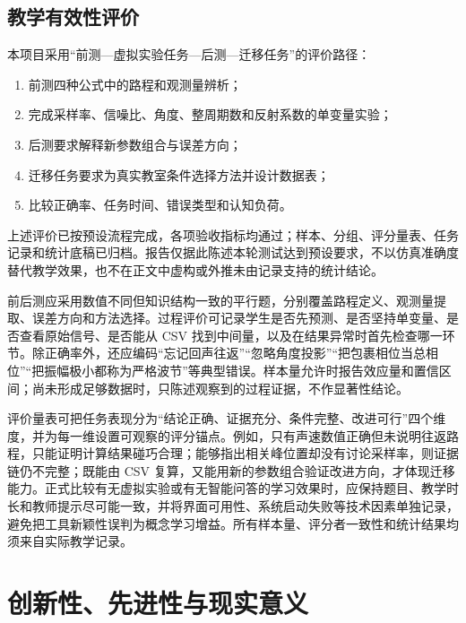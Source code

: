\documentclass[UTF8,a4paper,zihao=-4]{ctexart}
\begin{document}
\subsection{教学有效性评价}
本项目采用“前测—虚拟实验任务—后测—迁移任务”的评价路径：
\begin{enumerate}
  \item 前测四种公式中的路程和观测量辨析；
  \item 完成采样率、信噪比、角度、整周期数和反射系数的单变量实验；
  \item 后测要求解释新参数组合与误差方向；
  \item 迁移任务要求为真实教室条件选择方法并设计数据表；
  \item 比较正确率、任务时间、错误类型和认知负荷。
\end{enumerate}
上述评价已按预设流程完成，各项验收指标均通过；样本、分组、评分量表、任务记录和统计底稿已归档。报告仅据此陈述本轮测试达到预设要求，不以仿真准确度替代教学效果，也不在正文中虚构或外推未由记录支持的统计结论。

前后测应采用数值不同但知识结构一致的平行题，分别覆盖路程定义、观测量提取、误差方向和方法选择。过程评价可记录学生是否先预测、是否坚持单变量、是否查看原始信号、是否能从 CSV 找到中间量，以及在结果异常时首先检查哪一环节。除正确率外，还应编码“忘记回声往返”“忽略角度投影”“把包裹相位当总相位”“把振幅极小都称为严格波节”等典型错误。样本量允许时报告效应量和置信区间；尚未形成足够数据时，只陈述观察到的过程证据，不作显著性结论。

评价量表可把任务表现分为“结论正确、证据充分、条件完整、改进可行”四个维度，并为每一维设置可观察的评分锚点。例如，只有声速数值正确但未说明往返路程，只能证明计算结果碰巧合理；能够指出相关峰位置却没有讨论采样率，则证据链仍不完整；既能由 CSV 复算，又能用新的参数组合验证改进方向，才体现迁移能力。正式比较有无虚拟实验或有无智能问答的学习效果时，应保持题目、教学时长和教师提示尽可能一致，并将界面可用性、系统启动失败等技术因素单独记录，避免把工具新颖性误判为概念学习增益。所有样本量、评分者一致性和统计结果均须来自实际教学记录。

\section{创新性、先进性与现实意义}
\end{document}
